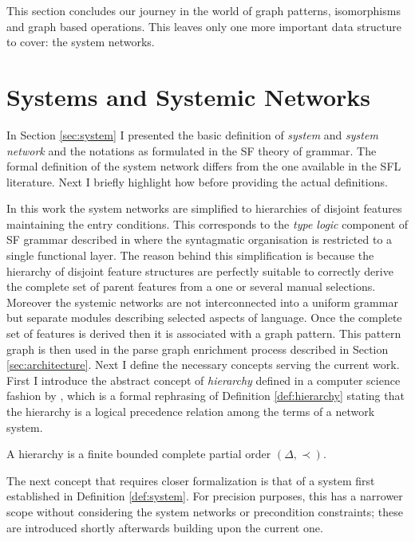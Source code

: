     This section concludes our journey in the world of graph patterns, isomorphisms and graph based operations. This leaves only one more important data structure to cover: the system networks. 

\section{Systems and Systemic Networks}
\label{sec:system-networks-cs}
    In Section \ref{sec:system} I presented the basic definition of \textit{system} and \textit{system network} and the notations as formulated in the SF theory of grammar. The formal definition of the system network differs from the one available in the SFL literature. Next I briefly highlight how before providing the actual definitions. 
    
    In this work the system networks are simplified to hierarchies of disjoint features maintaining the entry conditions. This corresponds to the \textit{type logic} component of SF grammar described in \citet{ODonnell1993} where the syntagmatic organisation is restricted to a single functional layer. The reason behind this simplification is because the hierarchy of disjoint feature structures are perfectly suitable to correctly derive the complete set of parent features from a one or several manual selections. Moreover the systemic networks are not interconnected into a uniform grammar but separate modules describing selected aspects of language. Once the complete set of features is derived then it is associated with a graph pattern. This pattern graph is then used in the parse graph enrichment process described in Section \ref{sec:architecture}. Next I define the necessary concepts serving the current work.  
    First I introduce the abstract concept of \textit{hierarchy} defined in a computer science fashion by \citet[30]{Pollard1987},  which is a formal rephrasing of Definition \ref{def:hierarchy} stating that the hierarchy is a logical precedence relation among the terms of a network system. 

    \begin{definition}[Hierarchy]\label{def:hierarchy-cs}
    	A hierarchy is a finite bounded complete partial order $(\varDelta,\prec)$. 
    \end{definition}

    The next concept that requires closer formalization is that of a system first established in Definition \ref{def:system}. For precision purposes, this has a narrower scope without considering the system networks or precondition constraints; these are introduced shortly afterwards building upon the current one.

